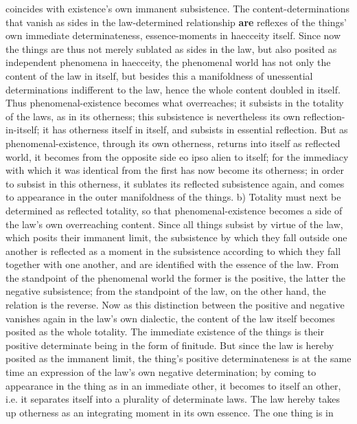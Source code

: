 \documentclass[12pt,a4paper,openany]{book}
\newcommand{\opage}[1]{\marginnote{\footnotesize\textit{[#1]}}}
\begin{document}
coincides with existence's own immanent
subsistence. The content-determinations that vanish
\setcounter{footnote}{0}%
\opage{191}as sides in the law-determined relationship \textbf{are} reflexes
of the things' own immediate determinateness, essence-moments
in haecceity itself. Since now the things
are thus not merely sublated as sides in the law,
but also posited as independent phenomena in
haecceity, the phenomenal world has not
only the content of the law in itself, but besides this
a manifoldness of unessential determinations indifferent to the law,
hence the whole content doubled
in itself. Thus phenomenal-existence becomes
what overreaches; it subsists in the totality of the laws,
as in its otherness; this subsistence is
nevertheless its own reflection-in-itself; it has otherness itself
in itself, and subsists in essential reflection.
But as phenomenal-existence, through its own
otherness, returns into itself as reflected
world, it becomes from the opposite side eo
ipso alien to itself; for the immediacy
with which it was identical from the first has now become
its otherness; in order to subsist in this otherness,
it sublates its reflected subsistence again,
and comes to appearance in the outer manifoldness of the things.
b) Totality must next be determined as reflected
totality, so that phenomenal-existence becomes a
side of the law's own overreaching content. Since
all things subsist by virtue of the law, which posits their
immanent limit, the subsistence
by which they fall outside one another is reflected as
a moment in the subsistence according to which they fall
together with one another, and are identified with the essence of the law.
From the standpoint of the phenomenal world
the former is the positive, the latter the negative
subsistence; from the standpoint of the law, on the other hand, the relation is
the reverse. Now as this distinction between
\setcounter{footnote}{0}%
\opage{192}the positive and negative vanishes again in the law's
own dialectic, the content of the law itself becomes posited as
the whole totality. The immediate existence of the things
is their positive determinate being in the form of finitude.
But since the law is hereby posited as the immanent
limit, the thing's positive determinateness is at the same time
an expression of the law's own negative determination;
by coming to appearance in the thing as in an
immediate other, it becomes to itself an other, i.e.
it separates itself into a plurality of determinate laws.
The law hereby takes up otherness as an integrating
moment in its own essence. The one thing is in
\end{document}

